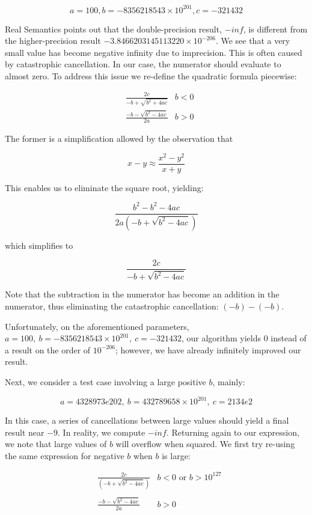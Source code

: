 $$a = 100, b = -8356218543 \times 10^{201}, c = -321432$$

Real Semantics points out that the double-precision result, $-inf$, is different from the higher-precision result $-3.8466203145113220 \times 10^{-206}$. We see that a very small value has become negative infinity due to imprecision. This is often caused by catastrophic cancellation. In our case, the numerator should evaluate to almost zero. To address this issue we re-define the quadratic formula piecewise:

\begin{align*}
&\frac{2c}{-b + \sqrt{b^2 + 4ac}} & b < 0 \\
&\frac{-b - \sqrt{b^2 - 4ac}}{2a} & b > 0
\end{align*}

The former is a simplification allowed by the observation that

$$ x - y \approx \frac{x^2 - y^2}{x + y} $$

This enables us to eliminate the square root, yielding:

$$ \frac{b^2 - b^2 - 4ac}{2a(-b + \sqrt{b^2 - 4ac})} $$

which simplifies to

$$ \frac{2c}{-b + \sqrt{b^2 - 4ac}} $$

Note that the subtraction in the numerator has become an addition in the numerator, thus eliminating the catastrophic cancellation: $(-b) - (-b)$.

Unfortunately, on the aforementioned parameters, $a = 100,~b = -8356218543 \times 10^{201},~c = -321432$, our algorithm yields $0$ instead of a result on the order of $10^{-206}$; however, we have already infinitely improved our result.

Next, we consider a test case involving a large positive $b$, mainly:

$$a = 4328973e202,~b = 432789658 \times 10^{201},~c = 2134e2$$

In this case, a series of cancellations between large values should yield a final result near $-9$. In reality, we compute $-inf$. Returning again to our expression, we note that large values of $b$ will overflow when squared. We first try re-using the same expression for negative $b$ when $b$ is large:

\begin{align*}
&\frac{2c}{(-b + \sqrt{b^2 - 4ac})} & b < 0 \textrm{ or } b > 10^{127}\\\\
&\frac{-b - \sqrt{b^2 - 4ac}}{2a} & b > 0
\end{align*}

